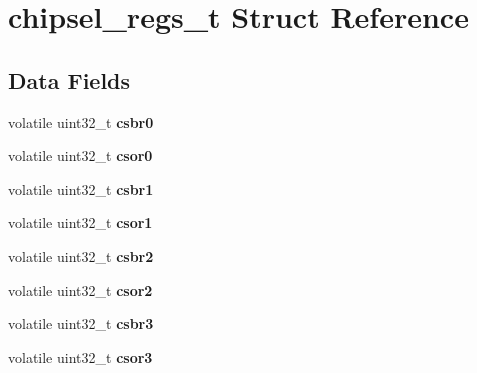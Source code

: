 \hypertarget{structchipsel__regs__t}{}\section{chipsel\+\_\+regs\+\_\+t Struct Reference}
\label{structchipsel__regs__t}
\subsection*{Data Fields}
\begin{DoxyCompactItemize}
\item 
\mbox{\label{structchipsel__regs__t_aca4ba6b76a35bb44aca5f22b847ebdd4}} 
volatile uint32\+\_\+t {\bfseries csbr0}
\item 
\mbox{\label{structchipsel__regs__t_adb9de8ade0a274f46dc172967c65ba1b}} 
volatile uint32\+\_\+t {\bfseries csor0}
\item 
\mbox{\label{structchipsel__regs__t_a90f04ddd4c04870a1794cb6c5593b738}} 
volatile uint32\+\_\+t {\bfseries csbr1}
\item 
\mbox{\label{structchipsel__regs__t_a1b914b97189610bdedbcf3441160f27b}} 
volatile uint32\+\_\+t {\bfseries csor1}
\item 
\mbox{\label{structchipsel__regs__t_aa9a2e517345ebb62e34b477b9919a8ec}} 
volatile uint32\+\_\+t {\bfseries csbr2}
\item 
\mbox{\label{structchipsel__regs__t_a603e266677663874285044884371acfc}} 
volatile uint32\+\_\+t {\bfseries csor2}
\item 
\mbox{\label{structchipsel__regs__t_ab9333e3d2aa5dc6482ebe6ec23299e74}} 
volatile uint32\+\_\+t {\bfseries csbr3}
\item 
\mbox{\label{structchipsel__regs__t_a7de6691b9b42eac01392ecb338d3f382}} 
volatile uint32\+\_\+t {\bfseries csor3}
\item 
\mbox{\label{structchipsel__regs__t_affa7cfbb4c01e15866f1801f038691be}} 

\end{DoxyCompactItemize}
